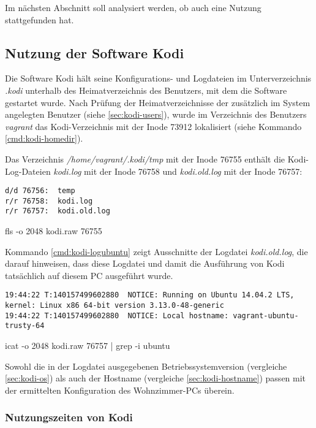 Im nächsten Abschnitt soll analysiert werden, ob auch eine Nutzung stattgefunden hat.

\subsection{Nutzung der Software Kodi}

Die Software Kodi hält seine Konfigurations- und Logdateien im Unterverzeichnis \textit{.kodi} unterhalb des Heimatverzeichnis des Benutzers, mit dem die Software gestartet wurde. Nach Prüfung der Heimatverzeichnisse der zusätzlich im System angelegten Benutzer (siehe \autoref{sec:kodi-users}), wurde im Verzeichnis des Benutzers \textit{vagrant} das Kodi-Verzeichnis mit der Inode 73912 lokalisiert (siehe Kommando \autoref{cmd:kodi-homedir}).

Das Verzeichnis \textit{/home/vagrant/.kodi/tmp} mit der Inode 76755 enthält die Kodi-Log-Dateien \textit{kodi.log} mit der Inode 76758 und \textit{kodi.old.log} mit der Inode 76757:

\begin{cmd}[H]
\begin{verbatim}
d/d 76756:	temp
r/r 76758:	kodi.log
r/r 76757:	kodi.old.log
\end{verbatim}
\caption{fls -o 2048 kodi.raw 76755}
\label{cmd:kodi-logs}
\end{cmd}

Kommando \autoref{cmd:kodi-logubuntu} zeigt Ausschnitte der Logdatei \textit{kodi.old.log}, die darauf hinweisen, dass diese Logdatei und damit die Ausführung von Kodi tatsächlich auf diesem PC ausgeführt wurde.

\begin{cmd}[H]
\begin{Verbatim}[fontsize=\tiny]
19:44:22 T:140157499602880  NOTICE: Running on Ubuntu 14.04.2 LTS, kernel: Linux x86 64-bit version 3.13.0-48-generic
19:44:22 T:140157499602880  NOTICE: Local hostname: vagrant-ubuntu-trusty-64
\end{Verbatim}
\caption{icat -o 2048 kodi.raw 76757 | grep -i ubuntu}
\label{cmd:kodi-logubuntu}
\end{cmd}

Sowohl die in der Logdatei ausgegebenen Betriebssystemversion (vergleiche \autoref{sec:kodi-os}) als auch der Hostname (vergleiche \autoref{sec:kodi-hostname}) passen mit der ermittelten Konfiguration des Wohnzimmer-PCs überein.

\subsubsection{Nutzungszeiten von Kodi}

